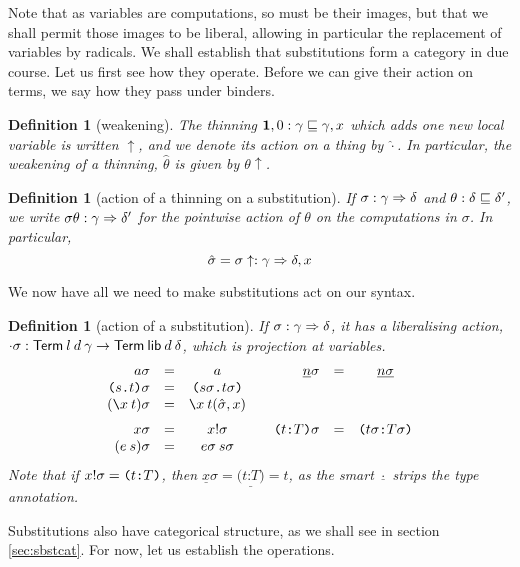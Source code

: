 \documentclass{jfp1}
\newtheorem{definition}[theorem]{Definition}
\newcommand{\Pa}[1]{\texttt{(}#1\texttt{)}}
\newcommand{\dt}{\texttt{.}}
\newcommand{\cn}[2]{\Pa{#1 \dt #2}}
\newcommand{\hb}{\texttt{:}}
\newcommand{\ra}[2]{\Pa{#1 \hb #2}}
\newcommand{\Ne}{\underline}
\begin{document}
Note that as variables are computations, so must be their images, but that we shall permit
those images to be liberal, allowing in particular the replacement of variables by radicals.
We shall establish that substitutions form a category in due
course. Let us first see how they operate. Before we can give their action on terms, we say how they
pass under binders.

\newcommand{\wk}{\uparrow}
\newcommand{\wka}{\hat}
\begin{definition}[weakening]
  The thinning $\mathbf{1},0 : \gamma\sqsubseteq\gamma,x$ which adds one new local variable is written
  $\wk$, and we denote its action on a thing by $\wka\cdot$. In particular, the weakening
  of a thinning, $\wka\theta$ is given by $\theta\wk$.
\end{definition}

\begin{definition}[action of a thinning on a substitution]
  If $\sigma:\gamma\Rightarrow\delta$ and $\theta:\delta\sqsubseteq\delta'$, we
  write $\sigma\theta:\gamma\Rightarrow\delta'$ for the pointwise action of
  $\theta$ on the computations in $\sigma$. In particular,
  \[
    \wka\sigma = \sigma\wk : \gamma\su\delta,x
    \]
\end{definition}

We now have all we need to make substitutions act on our syntax.

\begin{definition}[action of a substitution]
  If $\sigma:\gamma\Rightarrow \delta$, it has a liberalising action,
  $\cdot\sigma:\mathsf{Term}\:l\:d\:\gamma\to\mathsf{Term}\:\mathsf{lib}\:d\:\delta$, which is projection
  at variables.
  \[
    \begin{array}{rlc@{\qquad}rlc}
      a\sigma & = & a & \Ne n\sigma & = & \Ne{n\sigma} \\
      \cn st\sigma & = & \cn{s\sigma}{t\sigma} && \\
      (\la x t)\sigma & = & \la x t(\wka\sigma,x) && \medskip\\
      x\sigma & = & \sel x\sigma    & \ra tT\sigma & = & \ra{t\sigma}{T\sigma} \\
      (e\:s)\sigma & = & e\sigma\:s\sigma
    \end{array}
  \]
  Note that if $\sel x\sigma = \ra tT$, then $\Ne x\sigma = \Ne{\ra tT} =
  t$, as the smart $\Ne\cdot$ strips the type annotation.
\end{definition}

Substitutions also have categorical structure, as we shall see in
section \ref{sec:sbstcat}. For now, let us establish the operations.
\end{document}
